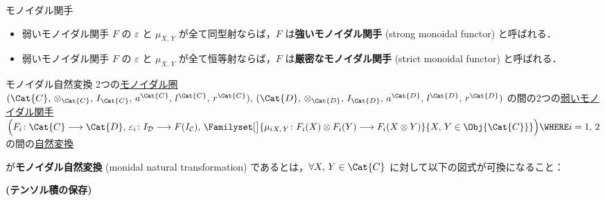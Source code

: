 \documentclass[TQFT_main]{subfiles}
\begin{document}
\begin{mydef}[label=redef:monidal-functor,breakable]{モノイダル関手}
\begin{description}
        \end{description}
        \tcblower
        \begin{itemize}
            \item 弱いモノイダル関手 $F$ の $\varepsilon$ と $\mu_{X,\, Y}$ が全て同型射ならば，$F$ は\textbf{強いモノイダル関手} (strong monoidal functor) と呼ばれる．
            \item 弱いモノイダル関手 $F$ の $\varepsilon$ と $\mu_{X,\, Y}$ が全て恒等射ならば，$F$ は\textbf{厳密なモノイダル関手} (strict monoidal functor) と呼ばれる．
        \end{itemize}
    \end{mydef}

    
    \begin{mydef}[label=def:monoidal-nat]{モノイダル自然変換}
        2つの\hyperref[redef:monoidal-category]{モノイダル圏} $(\Cat{C},\, \otimes_{\Cat{C}},\, I_{\Cat{C}},\, a^{\Cat{C}},\, l^{\Cat{C}},\, r^{\Cat{C}}),\, (\Cat{D},\, \otimes_{\Cat{D}},\, I_{\Cat{D}},\, a^{\Cat{D}},\, l^{\Cat{D}},\, r^{\Cat{D}})$ の間の2つの\hyperref[redef:monidal-functor]{弱いモノイダル関手}
        $\Bigl(F_i\colon \Cat{C} \lto \Cat{D},\, \varepsilon_i \colon I_{\mathcal{D}} \lto F(I_{\mathcal{C}}),\, \Familyset[\big]{\mu_i{}_{X,\, Y} \colon F_i(X) \otimes F_i(Y) \lto F_i(X \otimes Y)}{X,\, Y \in \Obj{\Cat{C}}}\Bigr)\WHERE i = 1,\, 2$
        の間の\hyperref[def:nat]{自然変換}
        \begin{center}
        \end{center}
        が\textbf{モノイダル自然変換} (monidal natural transformation) であるとは，$\forall X,\, Y \in \Cat{C}$ に対して以下の図式が可換になること：
        \begin{description}
            \item[\textbf{(テンソル積の保存)}]　
            
            \begin{center}
            \end{center}
            

\end{description}
\end{mydef}
\end{document}
